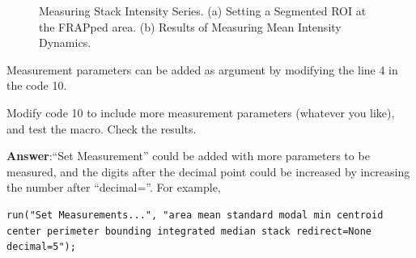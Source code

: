 \begin{figure}[htbp]
 \centering
 \quad
 \caption{Measuring Stack Intensity Series. (a) Setting a Segmented ROI at the FRAPped area. (b) Results of Measuring Mean Intensity Dynamics.}
 \label{fig:frapresults}
\end{figure}


Measurement parameters can be added as argument by modifying the line 4 in the code 10.

\begin{indentexercise}{1}
Modify code 10 to include more measurement parameters (whatever you like), and test the macro. Check the results. 

\item \textbf{Answer}:``Set Measurement'' could be added with more parameters to be measured, and the digits after the decimal point could be increased by increasing the number after ``decimal=''. For example, 
\begin{lstlisting}[numbers=none]
run("Set Measurements...", "area mean standard modal min centroid center perimeter bounding integrated median stack redirect=None decimal=5");
\end{lstlisting}

\end{indentexercise}

